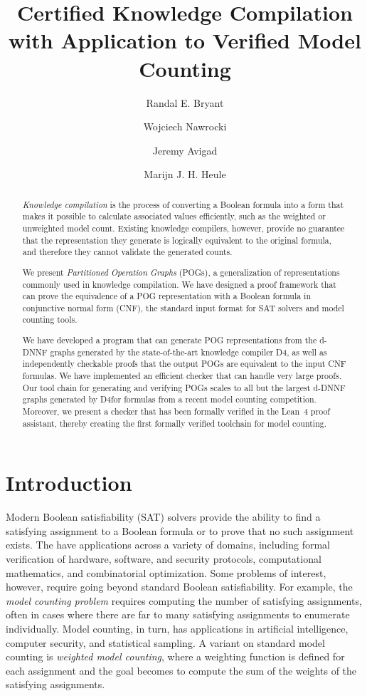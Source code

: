 \documentclass[letterpaper,USenglish,cleveref, autoref, thm-restate]{lipics-v2021}
\title{Certified Knowledge Compilation \\ with Application to Verified Model Counting}
\author{Randal E. Bryant}{Computer Science Department, Carnegie Mellon University, Pittsburgh, PA 15213 USA}{rebryant@cmu.edu}{https://orcid.org/0000-0001-5024-6613}{Supported by NSF grant CCF-2108521}
\author{Wojciech Nawrocki}{Department of Philosophy, Carnegie Mellon University}{wjnawrock@cmu.edu}{https://orcid.org/0000-0002-8839-0618}{}
\author{Jeremy Avigad}{Department of Philosophy, Carnegie Mellon University}{avigad@cmu.edu}{https://orcid.org/0000-0003-1275-315X}{}
\author{Marijn J. H. Heule}{Computer Science Department, Carnegie Mellon University}{marijn@cmu.edu}{https://orcid.org/0000-0002-5587-8801}{Supported by NSF grant CCF-2108521}
\newcommand{\progname}[1]{\textsc{#1}}
\newcommand{\dfour}{\progname{D4}}
\newcommand{\lean}{Lean~4}
\begin{document}
\maketitle

\begin{abstract}

\emph{Knowledge compilation} is the process of converting a Boolean
formula into a form that makes it possible to calculate associated
values efficiently, such as the weighted or unweighted model
count. Existing knowledge compilers, however,
provide no guarantee that the representation they generate
is logically equivalent to the original formula, and therefore they cannot validate the generated counts.

We present \emph{Partitioned Operation Graphs} (POGs), a generalization
of representations commonly used in knowledge compilation.
We have designed a proof framework that can prove the equivalence of a
POG representation with a Boolean formula in conjunctive normal form (CNF),
the standard input format for SAT solvers and model counting tools.

We have developed a program that can generate POG representations
from the d-DNNF graphs generated by the state-of-the-art knowledge
compiler \dfour, as well as independently checkable proofs that the
output POGs are equivalent to the input CNF formulas.
We have implemented an efficient checker
that can handle very large proofs. Our tool
chain for generating and verifying POGs scales to all but the largest d-DNNF graphs
generated by \dfour for formulas
from a recent model counting competition. Moreover, we
present a checker that has been formally verified
in the \lean{} proof assistant, thereby creating the
first formally verified toolchain for
model counting.
\end{abstract}

\section{Introduction}

Modern Boolean satisfiability (SAT) solvers provide the ability to
find a satisfying assignment to a Boolean formula or to prove that no
such assignment exists.  The have applications across a variety of
domains, including formal verification of hardware, software, and
security protocols, computational mathematics, and combinatorial
optimization.  Some problems of interest, however, require going
beyond standard Boolean satisfiability.  For example, the {\em model
  counting problem} requires computing the number of satisfying
assignments, often in cases where there are far to many satisfying
assignments to enumerate individually.  Model counting, in turn, has
applications in artificial intelligence, computer security, and
statistical sampling.  A variant on standard model counting is {\em
  weighted model counting}, where a weighting function is defined for
each assignment and the goal becomes to compute the sum of the weights
of the satisfying assignments.
\end{document}
